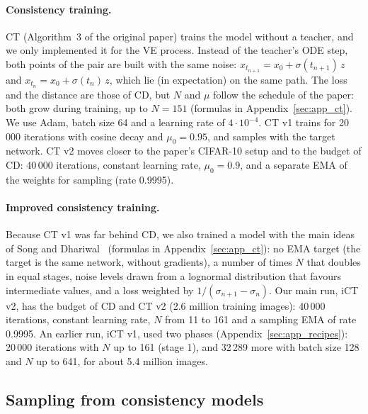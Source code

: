 \documentclass{article}
\begin{document}
\paragraph{Consistency training.} CT (Algorithm~3 of the original paper) trains
the model without a teacher, and we only implemented it for the VE process.
Instead of the teacher's ODE step, both points of the pair are built with the
same noise: $x_{t_{n+1}} = x_0 + \sigma(t_{n+1})\, z$ and
$x_{t_n} = x_0 + \sigma(t_n)\, z$, which lie (in expectation) on the same path.
The loss and the distance are those of CD, but $N$ and $\mu$ follow the schedule
of the paper: both grow during training, up to $N = 151$ (formulas in
Appendix~\ref{sec:app_ct}). We use Adam, batch size 64 and a learning rate of
$4\cdot10^{-4}$. CT v1 trains for 20\,000 iterations with cosine decay and
$\mu_0 = 0.95$, and samples with the target network. CT v2 moves closer to the
paper's CIFAR-10 setup and to the budget of CD: 40\,000 iterations, constant
learning rate, $\mu_0 = 0.9$, and a separate EMA of the weights for sampling
(rate 0.9995).

\paragraph{Improved consistency training.} Because CT v1 was far behind CD, we
also trained a model with the main ideas of Song and
Dhariwal~\cite{song2024improved} (formulas in Appendix~\ref{sec:app_ct}): no EMA
target (the target is the same network, without gradients), a number of times
$N$ that doubles in equal stages, noise levels drawn from a lognormal
distribution that favours intermediate values, and a loss weighted by
$1/(\sigma_{n+1} - \sigma_n)$. Our main run, iCT v2, has the budget of
CD and CT v2 (2.6 million training images): 40\,000 iterations, constant learning
rate, $N$ from 11 to 161 and a sampling EMA of rate 0.9995. An earlier run, iCT v1,
used two phases (Appendix~\ref{sec:app_recipes}): 20\,000 iterations with $N$ up
to 161 (stage 1), and 32\,289 more with batch size 128 and $N$ up to 641, for about
5.4 million images.

\subsection{Sampling from consistency models}
\label{sec:sampling}
\end{document}
